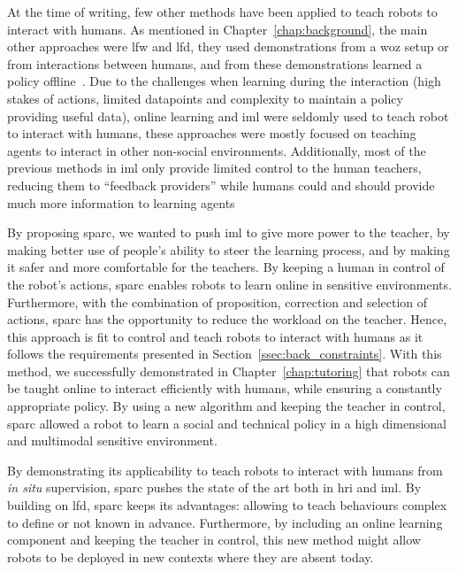 At the time of writing, few other methods have been applied to teach robots to interact with humans. As mentioned in Chapter~\ref{chap:background}, the main other approaches were \gls{lfw} and \gls{lfd}, they used demonstrations from a \gls{woz} setup or from interactions between humans, and from these demonstrations learned a policy offline~\citep{knox2014learning,liu2014train,sequeira2016discovering}. Due to the challenges when learning during the interaction (high stakes of actions, limited datapoints and complexity to maintain a policy providing useful data), online learning and \gls{iml} were seldomly used to teach robot to interact with humans, these approaches were mostly focused on teaching agents to interact in other non-social environments. Additionally, most of the previous methods in \gls{iml} only provide limited control to the human teachers, reducing them to ``feedback providers'' while humans could and should provide much more information to learning agents~\citep{amershi2014power}
	
By proposing \gls{sparc}, we wanted to push \gls{iml} to give more power to the teacher, by making better use of people's ability to steer the learning process, and by making it safer and more comfortable for the teachers. By keeping a human in control of the robot's actions, \gls{sparc} enables robots to learn online in sensitive environments. 
Furthermore, with the combination of proposition, correction and selection of actions, \gls{sparc} has the opportunity to reduce the workload on the teacher. Hence, this approach is fit to control and teach robots to interact with humans as it follows the requirements presented in Section~\ref{ssec:back_constraints}. With this method, we successfully demonstrated in Chapter~\ref{chap:tutoring} that robots can be taught online to interact efficiently with humans, while ensuring a constantly appropriate policy. By using a new algorithm and keeping the teacher in control, \gls{sparc} allowed a robot to learn a social and technical policy in a high dimensional and multimodal sensitive environment.

By demonstrating its applicability to teach robots to interact with humans from \textit{in situ} supervision, \gls{sparc} pushes the state of the art both in \gls{hri} and \gls{iml}. By building on \gls{lfd}, \gls{sparc} keeps its advantages: allowing to teach behaviours complex to define or not known in advance. Furthermore, by including an online learning component and keeping the teacher in control, this new method might allow robots to be deployed in new contexts where they are absent today.

